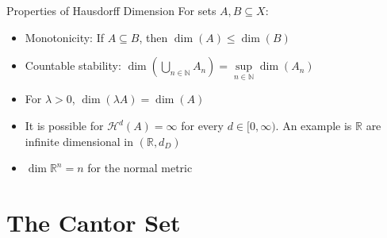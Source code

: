 \documentclass{beamer}
\DeclareMathOperator{\diam}{diam}
\begin{document}
\begin{frame}{Properties of Hausdorff Dimension}
    For sets $A, B \subseteq X$:
    \begin{itemize}
        \item Monotonicity: If $A \subseteq B$, then $\dim(A) \leq \dim(B)$
        \item Countable stability: $\dim\left(\bigcup\limits _{n \in \mathbb{N}} A_n\right) = \sup \limits _{n \in \mathbb{N}} \dim(A_n)$
        \item For $\lambda > 0$, $\dim(\lambda A) = \dim(A)$
        \item It is possible for $\mathcal{H}^d(A)=\infty$ for every $d \in [0, \infty)$. An example is $\mathbb{R}$ are infinite dimensional in $(\mathbb{R}, d_D)$
        \item $\dim \mathbb{R}^n=n$ for the normal metric
    \end{itemize}
\end{frame}
\section{The Cantor Set}
\end{document}
